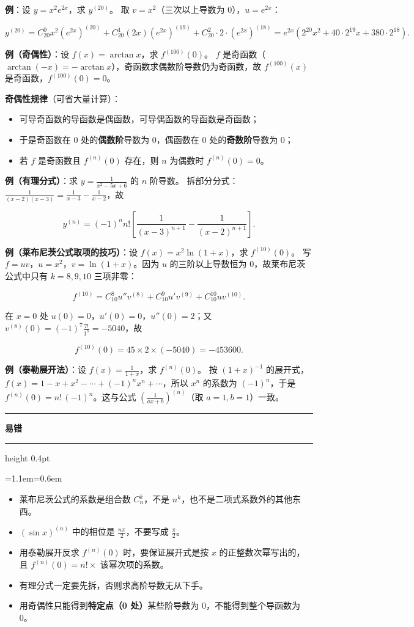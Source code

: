 \documentclass[11pt,openany,UTF8]{ctexbook}
\newcommand{\callouthead}[2]{%
  \par\addvspace{7pt}\noindent
  {\color{#1}\rule[-0.15em]{3pt}{1.05em}}\hspace{0.5em}%
  {\bfseries\color{#1}#2}\par\nobreak\vspace{-0.35em}%
  {\color{rulesep}\hrule height 0.4pt}\nobreak\vspace{0.45em}%
  \begingroup\small\setlength{\parindent}{0pt}%
  \leftskip=1.1em\rightskip=0.6em\noindent\ignorespaces}
\newcommand{\calloutend}{\par\endgroup\addvspace{7pt}}
\newenvironment{callwarn}[1]{\callouthead{warnbar}{#1}}{\calloutend}
\begin{document}
\textbf{例}：设 $y=x^2e^{2x}$，求 $y^{(20)}$。 取 $v=x^2$（三次以上导数为 0），$u=e^{2x}$：

\[y^{(20)}=C_{20}^0x^2(e^{2x})^{(20)}+C_{20}^1(2x)(e^{2x})^{(19)}+C_{20}^2\cdot 2\cdot(e^{2x})^{(18)}
=e^{2x}\left(2^{20}x^2+40\cdot 2^{19}x+380\cdot 2^{18}\right).\]

\textbf{例（奇偶性）}：设 $f(x)=\arctan x$，求 $f^{(100)}(0)$。 $f$ 是奇函数（$\arctan(-x)=-\arctan x$），奇函数求偶数阶导数仍为奇函数，故 $f^{(100)}(x)$ 是奇函数，$f^{(100)}(0)=0$。

\textbf{奇偶性规律}（可省大量计算）：

\begin{itemize}
\item 可导奇函数的导函数是偶函数，可导偶函数的导函数是奇函数；
\item 于是奇函数在 $0$ 处的\textbf{偶数阶}导数为 $0$，偶函数在 $0$ 处的\textbf{奇数阶}导数为 $0$；
\item 若 $f$ 是奇函数且 $f^{(n)}(0)$ 存在，则 $n$ 为偶数时 $f^{(n)}(0)=0$。
\end{itemize}
\textbf{例（有理分式）}：求 $y=\frac{1}{x^2-5x+6}$ 的 $n$ 阶导数。 拆部分分式：$\frac{1}{(x-2)(x-3)}=\frac{1}{x-3}-\frac{1}{x-2}$，故

\[y^{(n)}=(-1)^nn!\left[\frac{1}{(x-3)^{n+1}}-\frac{1}{(x-2)^{n+1}}\right].\]

\textbf{例（莱布尼茨公式取项的技巧）}：设 $f(x)=x^2\ln(1+x)$，求 $f^{(10)}(0)$。 写 $f=uv$，$u=x^2$，$v=\ln(1+x)$。因为 $u$ 的三阶以上导数恒为 $0$，故莱布尼茨公式中只有 $k=8,9,10$ 三项非零：

\[f^{(10)}=C_{10}^{8}u''v^{(8)}+C_{10}^{9}u'v^{(9)}+C_{10}^{10}uv^{(10)} .\]

在 $x=0$ 处 $u(0)=0$，$u'(0)=0$，$u''(0)=2$；又 $v^{(8)}(0)=(-1)^{7}\frac{7!}{1^8}=-5040$，故

\[f^{(10)}(0)=45\times 2\times(-5040)=-453600 .\]

\textbf{例（泰勒展开法）}：设 $f(x)=\frac{1}{1+x}$，求 $f^{(n)}(0)$。 按 $(1+x)^{-1}$ 的展开式，$f(x)=1-x+x^2-\cdots+(-1)^nx^n+\cdots$，所以 $x^n$ 的系数为 $(-1)^n$，于是 $f^{(n)}(0)=n!\,(-1)^n$。这与公式 $\left(\frac{1}{ax+b}\right)^{(n)}$（取 $a=1,b=1$）一致。

\begin{callwarn}{易错}
\begin{itemize}
\item 莱布尼茨公式的系数是组合数 $C_n^k$，不是 $n^k$，也不是二项式系数外的其他东西。
\item $(\sin x)^{(n)}$ 中的相位是 $\frac{n\pi}{2}$，不要写成 $\frac{\pi}{2}$。
\item 用泰勒展开反求 $f^{(n)}(0)$ 时，要保证展开式是按 $x$ 的正整数次幂写出的，且 $f^{(n)}(0)=n!\times$ 该幂次项的系数。
\item 有理分式一定要先拆，否则求高阶导数无从下手。
\item 用奇偶性只能得到\textbf{特定点（0 处）}某些阶导数为 0，不能得到整个导函数为 0。
\end{itemize}
\end{callwarn}
\end{document}
